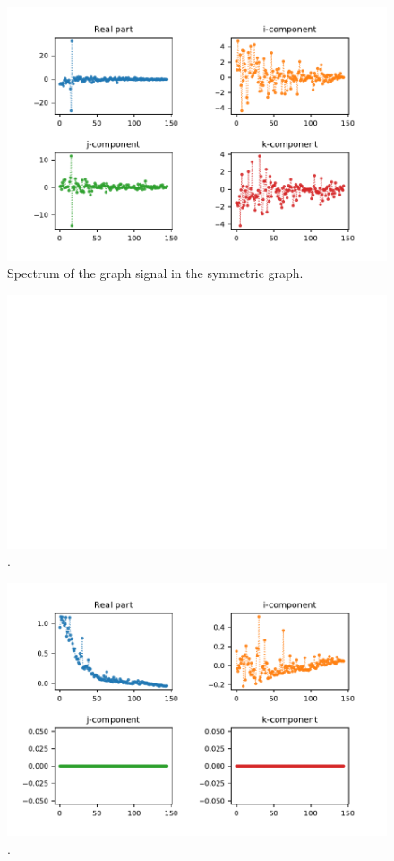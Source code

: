 \begin{figure}
	\centering
	\includegraphics[width=0.7\linewidth]{thesis/Figures/uk_qgft_spectrumsig.pdf}
	\caption{Spectrum of the graph signal in the symmetric graph.}
	\label{fig:uk_qgsp_spectrumsig}
\end{figure}


\begin{figure}
	\centering
	\includegraphics[width=0.7\linewidth]{thesis/Figures/cost_vs_iterations.pdf}
	\caption{.}
	\label{fig:cost_vs_iterations}
\end{figure}

\begin{figure}
	\centering
	\includegraphics[width=0.7\linewidth]{thesis/Figures/qlms_filter.pdf}
	\caption{.}
	\label{fig:qlms_filter}
\end{figure}

